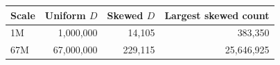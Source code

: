 \begin{tabular}{@{}lrrr@{}}
\toprule
\textbf{Scale} & \textbf{Uniform $D$} & \textbf{Skewed $D$} & \textbf{Largest skewed count} \\
\midrule
1M & 1,000,000 & 14,105 & 383,350 \\
67M & 67,000,000 & 229,115 & 25,646,925 \\
\bottomrule
\end{tabular}
